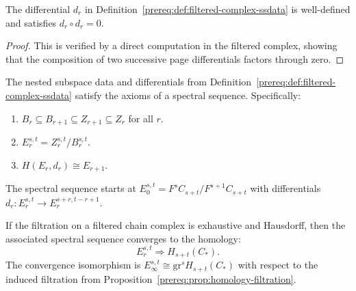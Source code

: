\begin{proposition}\label{prereq:prop:filtered-complex-ssdata-wd}
    \leanok
    The differential $d_r$ in Definition~\ref{prereq:def:filtered-complex-ssdata} is well-defined and satisfies $d_r \circ d_r = 0$.
\end{proposition}
\begin{proof}\leanok This is verified by a direct computation in the filtered complex, showing that the composition of two successive page differentials factors through zero.\end{proof}

\begin{theorem}\label{prereq:thm:filtered-complex-ss}
    \leanok
    The nested subspace data and differentials from Definition~\ref{prereq:def:filtered-complex-ssdata} satisfy the axioms of a spectral sequence. Specifically:
    \begin{enumerate}
        \item $B_r \subseteq B_{r+1} \subseteq Z_{r+1} \subseteq Z_r$ for all $r$.
        \item $E_r^{s,t} = Z_r^{s,t} / B_r^{s,t}$.
        \item $H(E_r, d_r) \cong E_{r+1}$.
    \end{enumerate}
    The spectral sequence starts at $E_0^{s,t} = F^s C_{s+t} / F^{s+1} C_{s+t}$ with differentials $d_r: E_r^{s,t} \to E_r^{s+r,t-r+1}$.
\end{theorem}

\begin{theorem}\label{prereq:thm:filtered-complex-convergence}
    \leanok
    If the filtration on a filtered chain complex is exhaustive and Hausdorff, then the associated spectral sequence converges to the homology:
    $$E_r^{s,t} \Longrightarrow H_{s+t}(C_*).$$
    The convergence isomorphism is $E_\infty^{s,t} \cong \mathrm{gr}^s H_{s+t}(C_*)$ with respect to the induced filtration from Proposition~\ref{prereq:prop:homology-filtration}.
\end{theorem}

